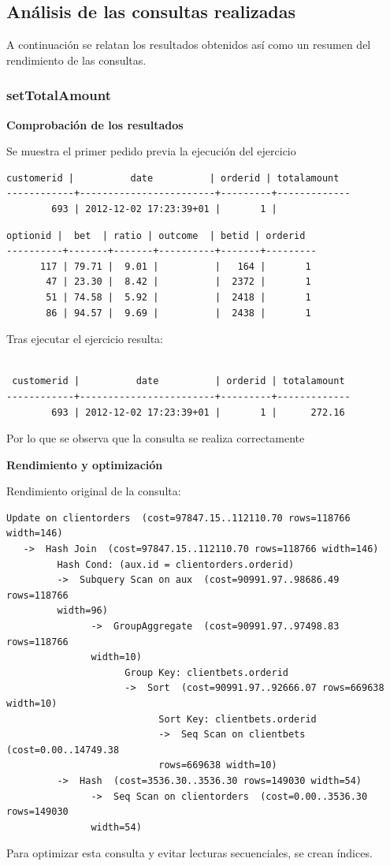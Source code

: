\documentclass{article}
\begin{document}
\subsection{Análisis de las consultas realizadas}
A continuación se relatan los resultados obtenidos así como un resumen del rendimiento de las consultas.
\subsubsection{setTotalAmount}

\textbf{Comprobación de los resultados}

Se muestra el primer pedido previa la ejecución del ejercicio
\lstset{basicstyle=\small,style=sql}
\begin{lstlisting}[style=sql]
 customerid |          date          | orderid | totalamount
------------+------------------------+---------+-------------
        693 | 2012-12-02 17:23:39+01 |       1 |
\end{lstlisting}
\begin{lstlisting}[style=sql]
 optionid |  bet  | ratio | outcome  | betid | orderid
----------+-------+-------+----------+-------+---------
      117 | 79.71 |  9.01 |          |   164 |       1
       47 | 23.30 |  8.42 |          |  2372 |       1
       51 | 74.58 |  5.92 |          |  2418 |       1
       86 | 94.57 |  9.69 |          |  2438 |       1
\end{lstlisting}
\newpage
Tras ejecutar el ejercicio resulta:
\begin{lstlisting}[style=sql]

 customerid |          date          | orderid | totalamount
------------+------------------------+---------+-------------
        693 | 2012-12-02 17:23:39+01 |       1 |      272.16
\end{lstlisting}
Por lo que se observa que la consulta se realiza correctamente
\bigbreak

\textbf{Rendimiento y optimización}

Rendimiento original de la consulta:
\lstset{basicstyle=\small,style=sql}
\begin{lstlisting}[style=sql]
 Update on clientorders  (cost=97847.15..112110.70 rows=118766 width=146)
   ->  Hash Join  (cost=97847.15..112110.70 rows=118766 width=146)
         Hash Cond: (aux.id = clientorders.orderid)
         ->  Subquery Scan on aux  (cost=90991.97..98686.49 rows=118766
         width=96)
               ->  GroupAggregate  (cost=90991.97..97498.83 rows=118766
               width=10)
                     Group Key: clientbets.orderid
                     ->  Sort  (cost=90991.97..92666.07 rows=669638 width=10)
                           Sort Key: clientbets.orderid
                           ->  Seq Scan on clientbets  (cost=0.00..14749.38
                           rows=669638 width=10)
         ->  Hash  (cost=3536.30..3536.30 rows=149030 width=54)
               ->  Seq Scan on clientorders  (cost=0.00..3536.30 rows=149030
               width=54)

\end{lstlisting}
Para optimizar esta consulta y evitar lecturas secuenciales, se crean índices.
\end{document}
